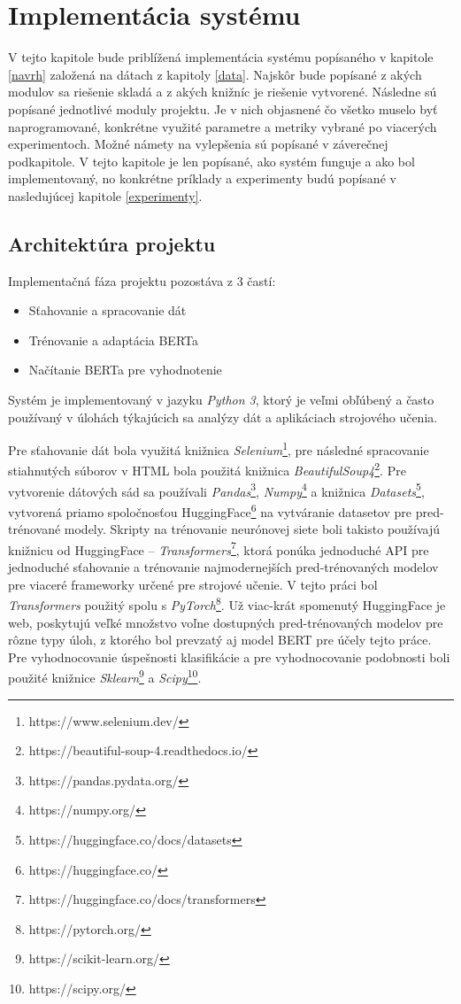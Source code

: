 \chapter{Implementácia systému}
\label{implementacia}
V tejto kapitole bude priblížená implementácia systému popísaného v kapitole \ref{navrh} založená na dátach z kapitoly \ref{data}. Najskôr bude popísané z akých modulov sa riešenie skladá a z akých knižníc je riešenie vytvorené. Následne sú popísané jednotlivé moduly projektu. Je v nich objasnené čo všetko muselo byť naprogramované, konkrétne využité parametre a metriky vybrané po viacerých experimentoch. Možné námety na vylepšenia sú popísané v záverečnej podkapitole. V tejto kapitole je len popísané, ako systém funguje a ako bol implementovaný, no konkrétne príklady a experimenty budú popísané v nasledujúcej kapitole \ref{experimenty}.

\section{Architektúra projektu}

Implementačná fáza projektu pozostáva z 3 častí: 
\begin{itemize}
    \item Sťahovanie a spracovanie dát
    \item Trénovanie a adaptácia BERTa
    \item Načítanie BERTa pre vyhodnotenie
\end{itemize} 

Systém je implementovaný v jazyku \textit{Python 3}, ktorý je veľmi obľúbený a často používaný v úlohách týkajúcich sa analýzy dát a aplikáciach strojového učenia. 

Pre sťahovanie dát bola využitá knižnica \textit{Selenium}\footnote{https://www.selenium.dev/}, pre následné spracovanie stiahnutých súborov v HTML bola použitá knižnica  \textit{BeautifulSoup4}\footnote{https://beautiful-soup-4.readthedocs.io/}. Pre vytvorenie dátových sád sa používali \textit{Pandas}\footnote{https://pandas.pydata.org/}, \textit{Numpy}\footnote{https://numpy.org/} a knižnica \textit{Datasets}\footnote{https://huggingface.co/docs/datasets}, vytvorená priamo spoločnosťou HuggingFace\footnote{https://huggingface.co/} na vytváranie datasetov pre pred-trénované modely. Skripty na trénovanie neurónovej siete boli takisto používajú knižnicu od HuggingFace -- \textit{Transformers}\footnote{https://huggingface.co/docs/transformers}, ktorá ponúka jednoduché API pre jednoduché sťahovanie a trénovanie najmodernejších pred-trénovaných modelov pre viaceré frameworky určené pre strojové učenie. V tejto práci bol \textit{Transformers} použitý spolu s \textit{PyTorch}\footnote{https://pytorch.org/}. Už viac-krát spomenutý HuggingFace je web, poskytujú veľké množstvo voľne dostupných pred-trénovaných modelov pre rôzne typy úloh, z ktorého bol prevzatý aj model BERT pre účely tejto práce. Pre vyhodnocovanie úspešnosti klasifikácie a pre vyhodnocovanie podobnosti boli použité knižnice \textit{Sklearn}\footnote{https://scikit-learn.org/} a \textit{Scipy}\footnote{https://scipy.org/}.
 
